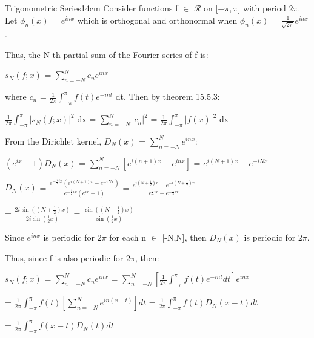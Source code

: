     \begin{definition}{Trigonometric Series}{14cm}
        Consider functions f $\in$ $\mathscr{R}$ on [$-\pi,\pi$] with period $2\pi$.
        Let $\phi_n(x)$ = $e^{inx}$ which is orthogonal and orthonormal
        when $\phi_n(x)$ = $\frac{1}{\sqrt{2\pi}} e^{inx}$.
        
        Thus, the N-th partial sum of the Fourier series of f is:

        \hspace{0.5cm}
        $s_N(f;x)$
        = $\sum_{n=-N}^N c_ne^{inx}$

        where $c_n$ = $\frac{1}{2\pi} \int_{-\pi}^{\pi} f(t)e^{-int}$ dt.
        Then by {\color{red} theorem 15.5.3}:

        \hspace{0.5cm}
        $\frac{1}{2\pi} \int_{-\pi}^{\pi} |s_N(f;x)|^2$ dx
        = $\sum_{n=-N}^N |c_n|^2$
        = $\frac{1}{2\pi} \int_{-\pi}^{\pi} |f(x)|^2$ dx

        \vspace{0.2cm}

        From the Dirichlet kernel,
        $D_N(x)$ = $\sum_{n=-N}^N e^{inx}$:
        
        \hspace{0.5cm}
        $(e^{ix} - 1)D_N(x)$
        = $\sum_{n=-N}^N [e^{i(n+1)x} - e^{inx}]$
        = $e^{i(N+1)x} - e^{-iNx}$

        \hspace{0.5cm}
        $D_N(x)$
        = $\frac{e^{-\frac{1}{2}ix}(e^{i(N+1)x} - e^{-iNx})}
                {e^{-\frac{1}{2}ix}(e^{ix} - 1)}$
        = $\frac{e^{i(N+\frac{1}{2})x} - e^{-i(N+\frac{1}{2})x}}
                {e^{\frac{1}{2}ix} - e^{-\frac{1}{2}ix}}$
        
        \hspace{1.8cm}
        = $\frac{2i\sin((N+\frac{1}{2})x)}{2i\sin(\frac{1}{2}x)}$
        = $\frac{\sin((N+\frac{1}{2})x)}{\sin(\frac{1}{2}x)}$

        Since $e^{inx}$ is periodic for $2\pi$ for each n $\in$ [-N,N], then
        $D_N(x)$ is periodic for $2\pi$.

        Thus, since f is also periodic for $2\pi$, then:

        \hspace{0.5cm}
        $s_N(f;x)$
        = $\sum_{n=-N}^N c_ne^{inx}$
        = $\sum_{n=-N}^N [\frac{1}{2\pi} \int_{-\pi}^{\pi} f(t)e^{-int} dt] e^{inx}$

        \hspace{2.1cm}
        = $\frac{1}{2\pi} \int_{-\pi}^{\pi} f(t) [\sum_{n=-N}^N e^{in(x-t)}] dt$
        = $\frac{1}{2\pi} \int_{-\pi}^{\pi} f(t) D_N(x-t) dt$

        \hspace{2.1cm}
        = $\frac{1}{2\pi} \int_{-\pi}^{\pi} f(x-t) D_N(t) dt$
    \end{definition}

